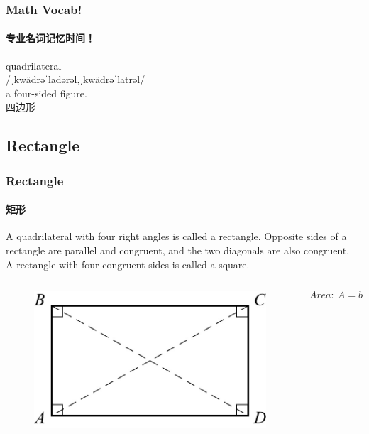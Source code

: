 \documentclass[
	11pt, %
	handout,
]{beamer}
\begin{document}
\begin{frame}
	\frametitle{Math Vocab!} %
	\framesubtitle{专业名词记忆时间！}
	
	{\Huge quadrilateral}\\
	{\LARGE /ˌkwädrəˈladərəl,ˌkwädrəˈlatrəl/\\
		\bigskip\bigskip
	a four-sided figure. \\ 
	四边形}

\end{frame}


\subsection{Rectangle}


\begin{frame}
	\frametitle{Rectangle} %
	\framesubtitle{矩形}
	\begin{definition}
		A quadrilateral with four right angles is called a rectangle.
Opposite sides of a rectangle are parallel and congruent, and the two
diagonals are also congruent. \\
A rectangle with four congruent sides is called a square.
	\end{definition}

	\begin{columns}[t] 
		\begin{column}{0.5\textwidth} %
			\begin{figure}
				\includegraphics[width=\linewidth]{Retangle.jpg}
			\end{figure}
		\end{column}
		\begin{column}{0.5\textwidth} %
			\begin{equation*}
				Area:\ A = base \cdot height
			\end{equation*}
		\end{column}
	\end{columns}
\end{frame}
\end{document}
